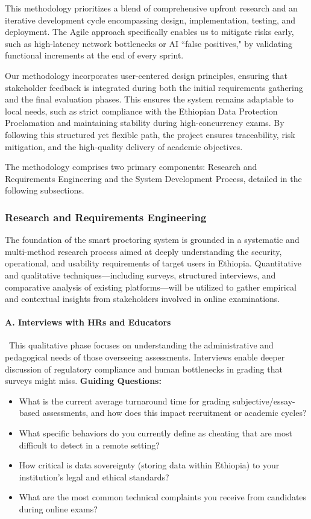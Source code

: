 This methodology prioritizes a blend of comprehensive upfront research and an iterative development cycle encompassing design, implementation, testing, and deployment. The Agile approach specifically enables us to mitigate risks early, such as high-latency network bottlenecks or AI ``false positives," by validating functional increments at the end of every sprint.

Our methodology incorporates user-centered design principles, ensuring that stakeholder feedback is integrated during both the initial requirements gathering and the final evaluation phases. This ensures the system remains adaptable to local needs, such as strict compliance with the Ethiopian Data Protection Proclamation and maintaining stability during high-concurrency exams. By following this structured yet flexible path, the project ensures traceability, risk mitigation, and the high-quality delivery of academic objectives.

The methodology comprises two primary components: Research and Requirements Engineering and the System Development Process, detailed in the following subsections.

\subsubsection{Research and Requirements Engineering}
The foundation of the smart proctoring system is grounded in a systematic and multi-method research process aimed at deeply understanding the security, operational, and usability requirements of target users in Ethiopia. Quantitative and qualitative techniques—including surveys, structured interviews, and comparative analysis of existing platforms—will be utilized to gather empirical and contextual insights from stakeholders involved in online examinations.

\paragraph*{A. Interviews with HRs and Educators}\
This qualitative phase focuses on understanding the administrative and pedagogical needs of those overseeing assessments. Interviews enable deeper discussion of regulatory compliance and human bottlenecks in grading that surveys might miss.
\textbf{Guiding Questions:}
\begin{itemize}
    \item What is the current average turnaround time for grading subjective/essay-based assessments, and how does this impact recruitment or academic cycles?
    \item What specific behaviors do you currently define as cheating that are most difficult to detect in a remote setting?
    \item How critical is data sovereignty (storing data within Ethiopia) to your institution's legal and ethical standards?
    \item What are the most common technical complaints you receive from candidates during online exams?
\end{itemize}

